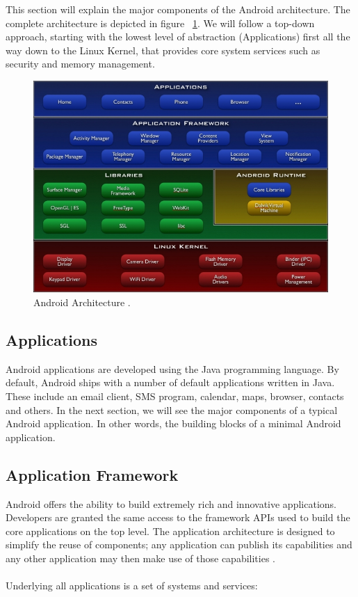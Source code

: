 This section will explain the major components of the Android architecture. The complete architecture is depicted in figure ~\ref{fig:android_architecture}. We will follow a top-down approach, starting with the lowest level of abstraction (Applications) first all the way down to the Linux Kernel, that provides core system services such as security and memory management.

\begin{figure}[h!]
\centering
\includegraphics[width=1.0\textwidth]{images/chap4_android_architecture.jpg}
\caption{Android Architecture \cite{WhatAndroid}.}
\label{fig:android_architecture}
\end{figure}

\subsection{Applications}

Android applications are developed using the Java programming language. By default, Android ships with a number of default applications written in Java. These include an email client, SMS program, calendar, maps, browser, contacts and others. In the next section, we will see the major components of a typical Android application. In other words, the building blocks of a minimal Android application.

\subsection{Application Framework}

Android offers the ability to build extremely rich and innovative applications. Developers are granted the same access to the framework APIs used to build the core applications on the top level. The application architecture is designed to simplify the reuse of components; any application can publish its capabilities and any other application may then make use of those capabilities \cite{WhatAndroid}. 
\\ \\
Underlying all applications is a set of systems and services:


